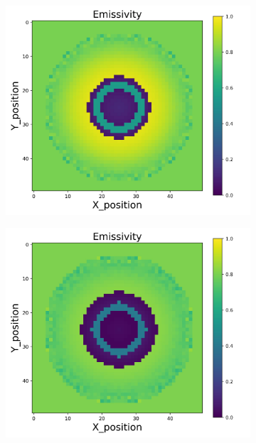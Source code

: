 \begin{figure}[p]
\begin{minipage}{\textwidth}
\begin{subfigure}{0.325\textwidth}
        \end{subfigure}
        \begin{subfigure}{0.325\textwidth}
            \centering
            \includegraphics[width=\textwidth]{figures/raw_data/23/quad/emi_cal.jpg}
        \end{subfigure}
        \begin{subfigure}{0.325\textwidth}
            \centering
            \includegraphics[width=\textwidth]{figures/raw_data/24/quad/emi_cal.jpg}

\end{subfigure}
\end{minipage}
\end{figure}
